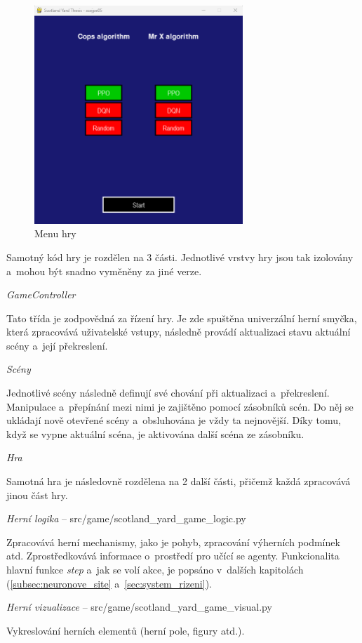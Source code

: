 \begin{figure}[H]
	\centering
	\includegraphics[width=0.7\textwidth]{obrazky-figures/game_title}
	\caption{Menu hry}\label{fig:game_title}
\end{figure}

Samotný kód hry je rozdělen na 3 části.
Jednotlivé vrstvy hry jsou tak izolovány a~mohou být snadno vyměněny za jiné verze.

\begin{myitemize}
  \item \emph{GameController}~\cite{GameSceneController}
  
  Tato třída je zodpovědná za řízení hry.
  Je zde spuštěna univerzální herní smyčka, která zpracovává uživatelské vstupy, následně provádí aktualizaci stavu aktuální scény a~její překreslení.
  \item \emph{Scény}~\cite{GameSceneController}
  
  Jednotlivé scény následně definují své chování při aktualizaci a~překreslení.
  Manipulace a~přepínání mezi nimi je zajištěno pomocí zásobníků scén.
  Do něj se ukládají nově otevřené scény a~obsluhována je vždy ta nejnovější.
  Díky tomu, když se vypne aktuální scéna, je aktivována další scéna ze zásobníku.

  \item \emph{Hra}

    Samotná hra je následovně rozdělena na 2 další části, přičemž každá zpracovává jinou část hry.
    \begin{myitemize}
      \item \emph{Herní logika} -- src/game/scotland\_yard\_game\_logic.py

      Zpracovává herní mechanismy, jako je pohyb, zpracování výherních podmínek atd.
      Zprostředkovává informace o~prostředí pro učící se agenty.
      Funkcionalita hlavní funkce \emph{step} a~jak se volí akce, je popsáno v~dalších kapitolách (\ref{subsec:neuronove_site} a~\ref{sec:system_rizeni}).

      \item \emph{Herní vizualizace} --  src/game/scotland\_yard\_game\_visual.py

      Vykreslování herních elementů (herní pole, figury atd.).
    \end{myitemize}
\end{myitemize}

